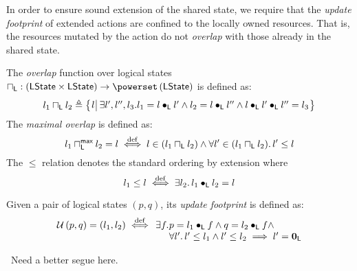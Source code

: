 %
%
In order to ensure sound extension of the shared state, we require that the \emph{update footprint} of extended actions are confined to the locally owned resources. That is, the resources mutated by the action do not \emph{overlap} with those already in the shared state.  
%
\begin{definition}[Overlap]
The \emph{overlap} function over logical states 
%
$
\meetL : \left(\LStates \times \LStates \right) \rightarrow \pset{\LStates}
$
%
is defined as:
%
\[
	l_1 \meetL l_2 \eqdef 
	\left\{ 
	\hspace*{-0.15cm}
	\begin{array}{l | l}
	 	l 
	 	\!\!&\!
	  \exsts{l', l'', l_3}\! l_1 = l \composeL l' \land l_2 = l \composeL l'' \land l \composeL l' \composeL l'' = l_3 
	\end{array}
	\hspace*{-0.15cm}
	\right\}
\]
%
The \emph{maximal overlap} is defined as:
%
\[
	l_1 \sqcap_{\textsf{L}}^{\textsf{max}} l_2 = l \stackrel{\mathrm{def}}{\iff} l \in (l_1 \sqcap_{\textsf{L}} l_2) \land \forall l' \in (l_1 \sqcap_{\textsf{L}} l_2).\, l' \leq l
\]
%
The $\leq$ relation denotes the standard ordering by extension where 
%
\[
	l_1 \leq l \stackrel{\mathrm{def}}{\iff} \exists l_2.\, l_1 \bullet_{\textsf{L}} l_2 = l
\]
%
\end{definition}
%
%
\begin{definition}
Given a pair of logical states $(p, q)$, its \emph{update footprint} is defined as:
%
\[
\begin{array}{l l l}
	\updateFP{p,q} = (l_1, l_2) \iffdef  
	&\hspace*{-0.2cm}	\exsts{f}\hspace*{-0.2cm}
	&\hspace*{-0.2cm} p = l_1 \composeL f \land q = l_2 \composeL f \land\\
	\hspace*{-0.2cm}
	&\hspace*{-0.2cm}&
	\hspace*{-0.2cm}\for{l'} l' \leq l_1 \land l' \leq l_2 \implies l' = \unitL
\end{array}
\]
%
\end{definition}
\todo\ Need a better segue here.\\
%

